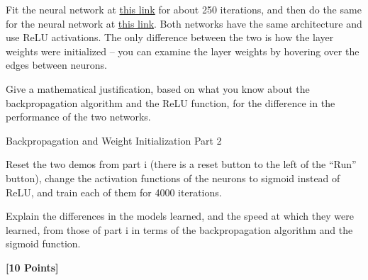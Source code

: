 Fit the neural network at \href{http://playground.tensorflow.org/#activation=relu&batchSize=10&dataset=circle&regDataset=reg-plane&learningRate=0.03&regularizationRate=0&noise=0&networkShape=4,2&seed=0.65409&showTestData=false&discretize=false&percTrainData=50&x=true&y=true&xTimesY=false&xSquared=false&ySquared=false&cosX=false&sinX=false&cosY=false&sinY=false&collectStats=false&problem=classification&initZero=false&hideText=false}{this link} for about 250 iterations, and then do the same for the neural network at  \href{http://playground.tensorflow.org//\#activation=relu&batchSize=10&dataset=circle&regDataset=reg-plane&learningRate=0.03&regularizationRate=0&noise=0&networkShape=4,2&seed=0.6&showTestData=false&discretize=false&percTrainData=50&x=true&y=true&xTimesY=false&xSquared=false&ySquared=false&cosX=false&sinX=false&cosY=false&sinY=false&collectStats=false&problem=classification&initZero=true&hideText=false}{this link}.  Both networks have the same architecture and use ReLU activations.  The only difference between the two is how the layer weights were initialized -- you can examine the layer weights by hovering over the edges between neurons.

Give a mathematical justification, based on what you know about the backpropagation algorithm and the ReLU function, for the difference in the performance of the two networks.

\begin{subsolution}

\end{subsolution}

\begin{problem}[5]
  Backpropagation and Weight Initialization Part 2
\end{problem}
Reset the two demos from part i (there is a reset button to the left of the ``Run'' button), change the activation functions of the neurons to sigmoid instead of ReLU, and train each of them for 4000 iterations.

Explain the differences in the models learned, and the speed at which they were learned, from those of part i in terms of the backpropagation algorithm and the sigmoid function.



\begin{subsolution}

\end{subsolution}



\problem \textbf{[10 Points]}

